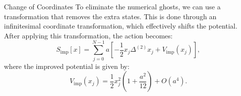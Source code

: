 \documentclass{beamer}
\begin{document}
\begin{frame}{Change of Coordinates}
    To eliminate the numerical ghosts, we can use a transformation that removes the extra states. This is done through an infinitesimal coordinate transformation, which effectively shifts the potential. After applying this transformation, the action becomes:
    \begin{equation*}
        S_{\text{imp}}[x] = \sum_{j=0}^{N-1} a  \left[-\frac{1}{2}x_j \Delta^{(2)} x_j + V_{\text{imp}}(x_j) \right],
    \end{equation*}
    where the improved potential is given by:
    \begin{equation*}
        V_{\text{imp}}(x_j) = \frac{1}{2}x_j^2 \left(1+\frac{a^2}{12}\right) + O(a^4).
    \end{equation*}
\end{frame}
\end{document}
